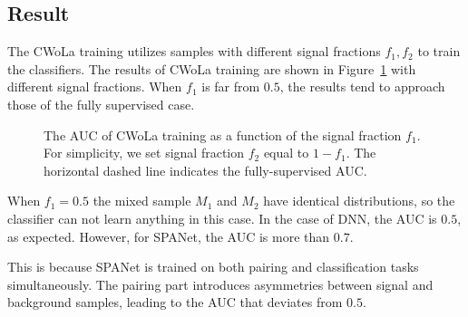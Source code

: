 \documentclass[12pt]{article}
\begin{document}
	\subsection{Result}%
	\label{sub:result}
		The CWoLa training utilizes samples with different signal fractions $f_1,f_2$ to train the classifiers. The results of CWoLa training are shown in Figure~\ref{fig:CWoLa_training_result} with different signal fractions. When $f_1$ is far from $0.5$, the results tend to approach those of the fully supervised case.
		\begin{figure}[htpb]
			\centering
			\caption{The AUC of CWoLa training as a function of the signal fraction $f_1$. For simplicity, we set signal fraction $f_2$ equal to $1 - f_1$. The horizontal dashed line indicates the fully-supervised AUC.}
			\label{fig:CWoLa_training_result}
		\end{figure}

		When $f_1 = 0.5$ the mixed sample $M_1$ and $M_2$ have identical distributions, so the classifier can not learn anything in this case. In the case of DNN, the AUC is $0.5$, as expected. However, for SPANet, the AUC is more than $0.7$.

		This is because SPANet is trained on both pairing and classification tasks simultaneously. The pairing part introduces asymmetries between signal and background samples, leading to the AUC that deviates from $0.5$.
\end{document}
